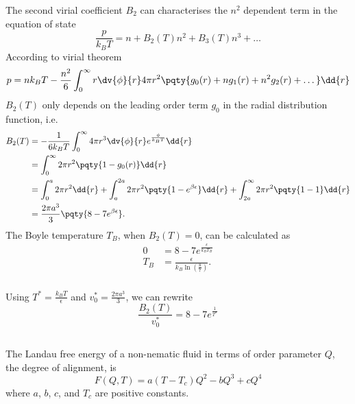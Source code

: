 \documentclass[12pt]{article}
\begin{document}
     \subsubsection{} The second virial coefficient \(B_2\) can characterises the \(n^2\) dependent term in the equation of state \[
        \frac{p}{k_BT} = n + B_2(T) n^2 + B_3(T) n^3 + \dots 
    \]
    According to virial theorem \[
        p = nk_BT - \frac{n^2}{6} \int_0^\infty r \dv{\phi}{r} 4\pi r^2 \pqty{g_0(r) + ng_1(r) + n^2 g_2(r) + \dots} \dd{r} 
    \]
    \(B_2(T)\) only depends on the leading order term \(g_0\) in the radial distribution function, i.e. \begin{align*}
        B_2(T) &= - \frac{1}{6k_BT} \int_0^\infty 4\pi r^3 \dv{\phi}{r} e^{\frac{\phi}{k_BT}}\dd{r}\\
        &= \int^\infty_0 2\pi r^2 \pqty{1 - g_0(r)}\dd{r}\\
        &= \int_0^a 2\pi r^2 \dd{r} +\int^{2a}_a 2\pi r^2 \pqty{1 - e^{\beta \epsilon}}\dd{r} +\int^{\infty}_{2a} 2\pi r^2 \pqty{1 - 1}\dd{r}\\
        &= \frac{2\pi a^3}{3}\pqty{8 - 7e^{\beta \epsilon}}.
    \end{align*}
    The Boyle temperature \(T_B\), when \(B_2(T) = 0\), can be calculated as \begin{align*}
        0 &= 8 - 7e^{\frac{\epsilon}{k_B T_B}}\\
        T_B &= \frac{\epsilon}{k_B\ln(\frac{8}{7})}.
    \end{align*}
     \subsubsection{} Using \(T^* = \frac{k_B T}{\epsilon}\) and \(v^*_0 = \frac{2\pi a^3}{3} \), we can rewrite \[
        \frac{B_2(T)}{v^*_0}  = 8 - 7e^{\frac{1}{T^*}}
    \]
    \begin{center}
        \def\svgwidth{300pt}
    \end{center}
     \subsection{} The Landau free energy of a non-nematic fluid in terms of order parameter \(Q\), the degree of alignment, is \[
        F(Q,T) = a(T - T_c) Q^2 - bQ^3 + cQ^4
    \]
    where \(a\), \(b\), \(c\), and \(T_c\) are positive constants.
\end{document}
